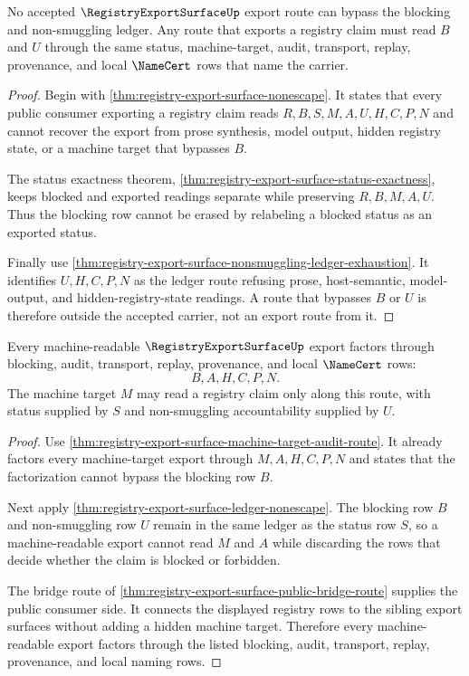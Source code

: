 \begin{theorem}
\label{thm:registry-export-surface-ledger-nonescape}
No accepted $\RegistryExportSurfaceUp$ export route can bypass the blocking and non-smuggling ledger. Any route that exports a registry claim must read $B$ and $U$ through the same status, machine-target, audit, transport, replay, provenance, and local $\NameCert$ rows that name the carrier.
\end{theorem}
\begin{proof}
Begin with \autoref{thm:registry-export-surface-nonescape}. It states that every public consumer exporting a registry claim reads $R,B,S,M,A,U,H,C,P,N$ and cannot recover the export from prose synthesis, model output, hidden registry state, or a machine target that bypasses $B$.

The status exactness theorem, \autoref{thm:registry-export-surface-status-exactness}, keeps blocked and exported readings separate while preserving $R,B,M,A,U$. Thus the blocking row cannot be erased by relabeling a blocked status as an exported status.

Finally use \autoref{thm:registry-export-surface-nonsmuggling-ledger-exhaustion}. It identifies $U,H,C,P,N$ as the ledger route refusing prose, host-semantic, model-output, and hidden-registry-state readings. A route that bypasses $B$ or $U$ is therefore outside the accepted carrier, not an export route from it.
\end{proof}

\begin{theorem}
\label{thm:registry-export-surface-machine-readable-blocking-route}
Every machine-readable $\RegistryExportSurfaceUp$ export factors through blocking, audit, transport, replay, provenance, and local $\NameCert$ rows:
$$
B,A,H,C,P,N .
$$
The machine target $M$ may read a registry claim only along this route, with status supplied by $S$ and non-smuggling accountability supplied by $U$.
\end{theorem}
\begin{proof}
Use \autoref{thm:registry-export-surface-machine-target-audit-route}. It already factors every machine-target export through $M,A,H,C,P,N$ and states that the factorization cannot bypass the blocking row $B$.

Next apply \autoref{thm:registry-export-surface-ledger-nonescape}. The blocking row $B$ and non-smuggling row $U$ remain in the same ledger as the status row $S$, so a machine-readable export cannot read $M$ and $A$ while discarding the rows that decide whether the claim is blocked or forbidden.

The bridge route of \autoref{thm:registry-export-surface-public-bridge-route} supplies the public consumer side. It connects the displayed registry rows to the sibling export surfaces without adding a hidden machine target. Therefore every machine-readable export factors through the listed blocking, audit, transport, replay, provenance, and local naming rows.
\end{proof}

